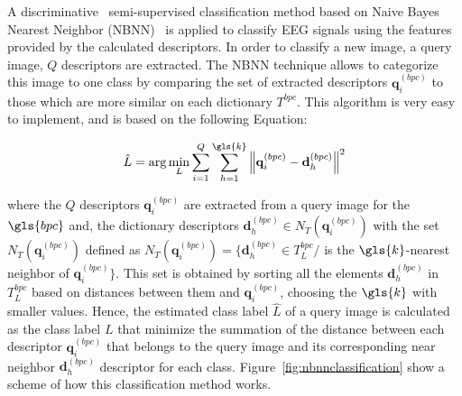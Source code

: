 A discriminative~\cite{WolpawJonathanR2012} semi-supervised classification method based on Naive Bayes Nearest Neighbor (NBNN)~\cite{Boiman2008} is applied to classify EEG signals using the features provided by the calculated descriptors. In order to classify a new image, a query image, $Q$ descriptors are extracted.  The NBNN technique allows to categorize this image to one class by comparing the set of extracted descriptors $\mathbf{q}_{i}^{(bpc)}$ to those which are more similar on each dictionary $T^{bpc}$.  This algorithm is very easy to implement, and is based on the following Equation:

\begin{equation}
\hat{L} = \arg \min_{L} \sum_{i=1}^{Q} \sum_{h=1}^{\gls{k}} {\left\lVert \mathbf{q}_{i}^{(bpc)} -  \mathbf{d}_{h}^{(bpc)} \right\rVert}  ^{2} 
\label{eq:classification}
\end{equation}

\noindent where the $Q$ descriptors $ \mathbf{q}_{i}^{(bpc)} $ are extracted from a query image for the $\gls{bpc}$ and, the dictionary descriptors  $\mathbf{d}_{h}^{(bpc)} \in N_T(  \mathbf{q}_{i}^{(bpc)} )$ with the set $N_T(  \mathbf{q}_{i}^{(bpc)} ) $ defined as $N_T(  \mathbf{q}_{i}^{(bpc)} ) = \{ \mathbf{d}_{h}^{(bpc)} \in T_{L}^{bpc} / $ is the $\gls{k}$-nearest neighbor of $  \mathbf{q}_{i}^{(bpc)} \}$.  This set is obtained by sorting all the elements $ \mathbf{d}_{h}^{(bpc)} $ in $T_{L}^{bpc}$ based on distances between them and $\mathbf{q}_{i}^{(bpc)}$, choosing the $\gls{k}$ with smaller values.  Hence, the estimated class label $\hat{L}$ of a query image is calculated as the class label $L$ that minimize the summation of the distance between each descriptor $\mathbf{q}_{i}^{(bpc)}$ that belongs to the query image and its corresponding near neighbor $\mathbf{d}_{h}^{(bpc)} $  descriptor for each class. Figure~\ref{fig:nbnnclassification} show a scheme of how this classification method works.

